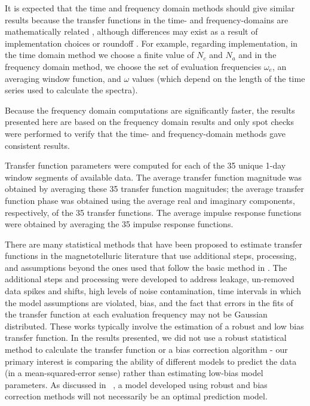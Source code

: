 \documentclass[draft,linenumbers]{agujournal2018}
\begin{document}
It is expected that the time and frequency domain methods should give similar results because the transfer functions in the time- and frequency-domains are mathematically related \citep{Schoukens2004,Ljung2007}, although differences may exist as a result of implementation choices or roundoff \citep{Ljung2004}.  For example, regarding implementation, in the time domain method we choose a finite value of $N_c$ and $N_a$ and in the frequency domain method, we choose the set of evaluation frequencies $\omega_e$, an averaging window function, and $\omega$ values (which depend on the length of the time series used to calculate the spectra).

Because the frequency domain computations are significantly faster, the results presented here are based on the frequency domain results and only spot checks were performed to verify that the time- and frequency-domain methods gave consistent results.

Transfer function parameters were computed for each of the 35 unique 1-day window segments of available data. The average transfer function magnitude was obtained by averaging these 35 transfer function magnitudes; the average transfer function phase was obtained using the average real and imaginary components, respectively, of the 35 transfer functions. The average impulse response functions were obtained by averaging the 35 impulse response functions.

There are many statistical methods that have been proposed to estimate transfer functions in the magnetotelluric literature that use additional steps, processing, and assumptions \citep{Egbert1986,Chave1987,Chave1989,Jones1989,Larsen1996,Egbert1997,Eisel2001,Chave2004,Chave2012,Chave2017} beyond the ones used that follow the basic method in \cite{Simpson2005}. The additional steps and processing were developed to address leakage, un-removed data spikes and shifts, high levels of noise contamination, time intervals in which the model assumptions are violated, bias, and the fact that errors in the fits of the transfer function at each evaluation frequency may not be Gaussian distributed. These works typically involve the estimation of a robust and low bias transfer function. In the results presented, we did not use a robust statistical method to calculate the transfer function or a bias correction algorithm - our primary interest is comparing the ability of different models to predict the data (in a mean-squared-error sense) rather than estimating low-bias model parameters. As discussed in ~\cite{Weigel2017}, a model developed using robust and bias correction methods will not necessarily be an optimal prediction model.
\end{document}
